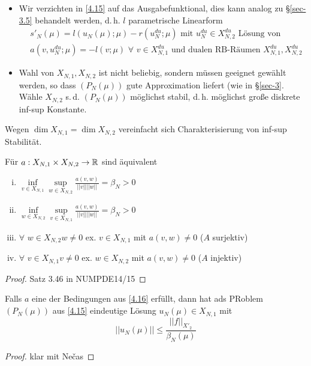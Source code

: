 \begin{bem} \beginwithlistbem
	\begin{itemize}
		\item Wir verzichten in \ref{4.15} auf das Ausgabefunktional, dies kann analog zu §\ref{sec-3.5} behandelt werden, d.\,h. $l$ parametrische Linearform
		\begin{align}
			&s'_N(\mu) = l(u_N(\mu);\mu) - r(u_N^{du};\mu) \text{ mit } u_N^{du} \in X_{N,2}^{du} \text{ Lösung von} \label{eq:4.5} \\
			&a(v, u_N^{du};\mu) = -l(v;\mu) \,\, \forall \,\, v \in X_{N,1}^{du} \text{ und dualen RB-Räumen } X_{N,1}^{du}, X_{N,2}^{du} \label{eq:4.6}
		\end{align}
		\item Wahl von $X_{N,1}, X_{N,2}$ ist nicht beliebig, sondern müssen geeignet gewählt werden, so dass $(P_N(\mu))$ gute Approximation liefert (wie in §\ref{sec-3}. Wähle $X_{N,2}$ s.\,d. $(P_N(\mu))$ möglichst stabil, d.\,h. möglichst große diskrete inf-sup Konstante.
	\end{itemize}
\end{bem}

Wegen $\dim X_{N,1} = \dim X_{N,2}$ vereinfacht sich Charakterisierung von inf-sup Stabilität.

\begin{satz} \label{4.16}
Für $a: X_{N,1} \times X_{N,2} \rightarrow \mathbb{R}$ sind äquivalent
\begin{enumerate}[i)]
	\item $\inf\limits_{v \in X_{N,1}} \sup\limits_{w \in X_{N,2}} \frac{a(v,w)}{||v|| ||w||} = \beta_N > 0$
	\item $\inf\limits_{w \in X_{N,2}} \sup\limits_{v \in X_{N,1}} \frac{a(v,w)}{||v|| ||w||} = \beta_N > 0$
	\item $\forall \,\, w \in X_{N,2} w \neq 0$ ex. $v \in X_{N,1}$ mit $a(v,w) \neq 0$ ($A$ surjektiv)
	\item $\forall \,\, v \in X_{N,1} v \neq 0$ ex. $w \in X_{N,2}$ mit $a(v,w) \neq 0$ ($A$ injektiv)
\end{enumerate}
\begin{proof}
Satz 3.46 in NUMPDE14/15
\end{proof}
\end{satz}

\begin{kor}
Falls $a$ eine der Bedingungen aus \ref{4.16} erfüllt, dann hat ads PRoblem $(P_N(\mu))$ aus \ref{4.15} eindeutige Lösung $u_N(\mu) \in X_{N,1}$ mit
\[
	||u_N(\mu)|| \leq \frac{||f||_{X'_2}}{\beta_N(\mu)}
\]
\begin{proof}
klar mit Ne\v{c}as
\end{proof}
\end{kor}

